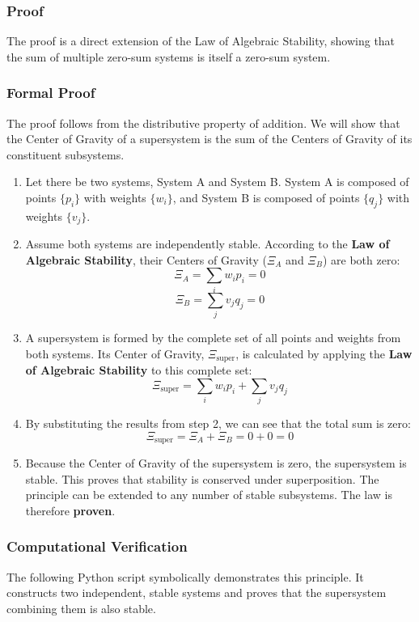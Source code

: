 \subsubsection*{Proof}
The proof is a direct extension of the Law of Algebraic Stability, showing that the sum of multiple zero-sum systems is itself a zero-sum system.

\subsubsection*{Formal Proof}
The proof follows from the distributive property of addition. We will show that the Center of Gravity of a supersystem is the sum of the Centers of Gravity of its constituent subsystems.

\begin{enumerate}
    \item Let there be two systems, System A and System B. System A is composed of points $\{p_i\}$ with weights $\{w_i\}$, and System B is composed of points $\{q_j\}$ with weights $\{v_j\}$.
    
    \item Assume both systems are independently stable. According to the \textbf{Law of Algebraic Stability}, their Centers of Gravity ($\Xi_A$ and $\Xi_B$) are both zero:
    $$ \Xi_A = \sum_{i} w_i p_i = 0 $$
    $$ \Xi_B = \sum_{j} v_j q_j = 0 $$
    
    \item A supersystem is formed by the complete set of all points and weights from both systems. Its Center of Gravity, $\Xi_{\text{super}}$, is calculated by applying the \textbf{Law of Algebraic Stability} to this complete set:
    $$ \Xi_{\text{super}} = \sum_{i} w_i p_i + \sum_{j} v_j q_j $$
    
    \item By substituting the results from step 2, we can see that the total sum is zero:
    $$ \Xi_{\text{super}} = \Xi_A + \Xi_B = 0 + 0 = 0 $$
    
    \item Because the Center of Gravity of the supersystem is zero, the supersystem is stable. This proves that stability is conserved under superposition. The principle can be extended to any number of stable subsystems. The law is therefore \textbf{proven}.
\end{enumerate}

\subsubsection*{Computational Verification}
The following Python script symbolically demonstrates this principle. It constructs two independent, stable systems and proves that the supersystem combining them is also stable.

